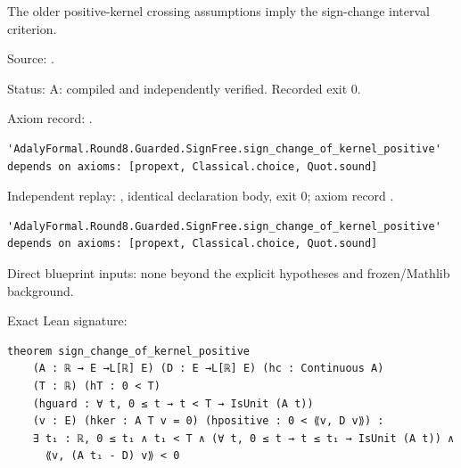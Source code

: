 \begin{theorem}[bp-070]
\label{bp-070}
\uses{}
\leanok
The older positive-kernel crossing assumptions imply the sign-change interval criterion.

\par Source: \texttt{}.
\par Status: A: compiled and independently verified. Recorded exit 0.
\par Axiom record: \texttt{}.
\begin{verbatim}
'AdalyFormal.Round8.Guarded.SignFree.sign_change_of_kernel_positive' depends on axioms: [propext, Classical.choice, Quot.sound]
\end{verbatim}
\par Independent replay: \texttt{}, identical declaration body, exit 0; axiom record \texttt{}.
\begin{verbatim}
'AdalyFormal.Round8.Guarded.SignFree.sign_change_of_kernel_positive' depends on axioms: [propext, Classical.choice, Quot.sound]
\end{verbatim}
\par Direct blueprint inputs: none beyond the explicit hypotheses and frozen/Mathlib background.
\par Exact Lean signature:
\begin{verbatim}
theorem sign_change_of_kernel_positive
    (A : ℝ → E →L[ℝ] E) (D : E →L[ℝ] E) (hc : Continuous A)
    (T : ℝ) (hT : 0 < T)
    (hguard : ∀ t, 0 ≤ t → t < T → IsUnit (A t))
    (v : E) (hker : A T v = 0) (hpositive : 0 < ⟪v, D v⟫) :
    ∃ t₁ : ℝ, 0 ≤ t₁ ∧ t₁ < T ∧ (∀ t, 0 ≤ t → t ≤ t₁ → IsUnit (A t)) ∧
      ⟪v, (A t₁ - D) v⟫ < 0
\end{verbatim}
\end{theorem}

